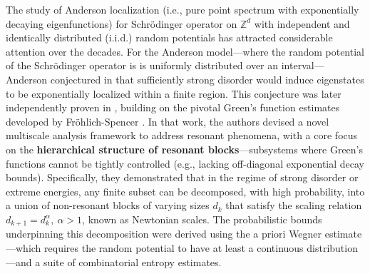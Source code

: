 \documentclass[11pt,reqno,UTF8,twoside]{amsart}
\newcommand{\Z}{\mathbb{Z}}
\theoremstyle{definition}
\numberwithin{equation}{section}
\begin{document}
The study of Anderson localization (i.e., pure point spectrum with exponentially decaying eigenfunctions) for Schr\"odinger operator on $\Z^d$
with independent and identically distributed (i.i.d.) random potentials has attracted considerable attention over the decades. For the Anderson model—where the random potential of the Schr\"odinger operator  is   is uniformly distributed over an interval—Anderson conjectured in \cite{And58} that sufficiently strong disorder would induce eigenstates to be exponentially localized within a finite region. This conjecture was later independently proven in \cite{FMSS85, DLS85, SW86}, building on the pivotal Green’s function estimates developed by Fr\"ohlich-Spencer \cite{FS83}.  In that work, the authors devised a novel multiscale analysis framework to address resonant phenomena, with a core focus on the {\bf hierarchical structure of resonant blocks}—subsystems where Green’s functions cannot be tightly controlled (e.g., lacking off-diagonal exponential decay bounds). Specifically, they demonstrated that in the regime of strong disorder or extreme energies, any finite subset can be decomposed, with high probability, into a union of non-resonant blocks of varying sizes $d_k$ that satisfy the scaling relation $d_{k+1}=d_k^{\alpha},\ \alpha>1$, known as Newtonian scales. The probabilistic bounds underpinning this decomposition were derived using the a priori Wegner estimate \cite{Weg81}—which requires the random potential to have at least a continuous distribution—and a suite of combinatorial entropy estimates.
\end{document}
